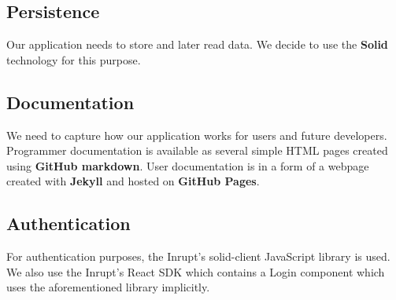 \subsection{Persistence}
Our application needs to store and later read data.
We decide to use the \textbf{Solid} technology for this purpose. 

\subsection{Documentation}
We need to capture how our application works for users and future developers.
Programmer documentation is available as several simple HTML pages created using \textbf{GitHub markdown}.
User documentation is in a form of a webpage created with \textbf{Jekyll} and hosted on \textbf{GitHub Pages}.

\subsection{Authentication}
For authentication purposes, the Inrupt's solid-client JavaScript library is used.
We also use the Inrupt's React SDK which contains a Login component which uses the aforementioned library implicitly.




